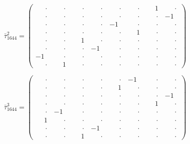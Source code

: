 \documentclass[
  10pt,
]{article}
\begin{document}
\[
\bar\tau_{1644}^{2} = \left(\begin{array}{rrrr|rrrr}
\phantom{-}\cdot & \phantom{-}\cdot & \phantom{-}\cdot & \phantom{-}\cdot & \phantom{-}\cdot & \phantom{-}\cdot & \phantom{-}1 & \phantom{-}\cdot \\[-1.8pt]
\phantom{-}\cdot & \phantom{-}\cdot & \phantom{-}\cdot & \phantom{-}\cdot & \phantom{-}\cdot & \phantom{-}\cdot & \phantom{-}\cdot & -1 \\[-1.8pt]
\phantom{-}\cdot & \phantom{-}\cdot & \phantom{-}\cdot & \phantom{-}\cdot & -1 & \phantom{-}\cdot & \phantom{-}\cdot & \phantom{-}\cdot \\[-1.8pt]
\phantom{-}\cdot & \phantom{-}\cdot & \phantom{-}\cdot & \phantom{-}\cdot & \phantom{-}\cdot & \phantom{-}1 & \phantom{-}\cdot & \phantom{-}\cdot \\[-1.8pt]
\hline
\phantom{-}\cdot & \phantom{-}\cdot & \phantom{-}1 & \phantom{-}\cdot & \phantom{-}\cdot & \phantom{-}\cdot & \phantom{-}\cdot & \phantom{-}\cdot \\[-1.8pt]
\phantom{-}\cdot & \phantom{-}\cdot & \phantom{-}\cdot & -1 & \phantom{-}\cdot & \phantom{-}\cdot & \phantom{-}\cdot & \phantom{-}\cdot \\[-1.8pt]
-1 & \phantom{-}\cdot & \phantom{-}\cdot & \phantom{-}\cdot & \phantom{-}\cdot & \phantom{-}\cdot & \phantom{-}\cdot & \phantom{-}\cdot \\[-1.8pt]
\phantom{-}\cdot & \phantom{-}1 & \phantom{-}\cdot & \phantom{-}\cdot & \phantom{-}\cdot & \phantom{-}\cdot & \phantom{-}\cdot & \phantom{-}\cdot
\end{array}\right)
\]

\[
\bar\tau_{1644}^{3} = \left(\begin{array}{rrrr|rrrr}
\phantom{-}\cdot & \phantom{-}\cdot & \phantom{-}\cdot & \phantom{-}\cdot & \phantom{-}\cdot & -1 & \phantom{-}\cdot & \phantom{-}\cdot \\[-1.8pt]
\phantom{-}\cdot & \phantom{-}\cdot & \phantom{-}\cdot & \phantom{-}\cdot & \phantom{-}1 & \phantom{-}\cdot & \phantom{-}\cdot & \phantom{-}\cdot \\[-1.8pt]
\phantom{-}\cdot & \phantom{-}\cdot & \phantom{-}\cdot & \phantom{-}\cdot & \phantom{-}\cdot & \phantom{-}\cdot & \phantom{-}\cdot & -1 \\[-1.8pt]
\phantom{-}\cdot & \phantom{-}\cdot & \phantom{-}\cdot & \phantom{-}\cdot & \phantom{-}\cdot & \phantom{-}\cdot & \phantom{-}1 & \phantom{-}\cdot \\[-1.8pt]
\hline
\phantom{-}\cdot & -1 & \phantom{-}\cdot & \phantom{-}\cdot & \phantom{-}\cdot & \phantom{-}\cdot & \phantom{-}\cdot & \phantom{-}\cdot \\[-1.8pt]
\phantom{-}1 & \phantom{-}\cdot & \phantom{-}\cdot & \phantom{-}\cdot & \phantom{-}\cdot & \phantom{-}\cdot & \phantom{-}\cdot & \phantom{-}\cdot \\[-1.8pt]
\phantom{-}\cdot & \phantom{-}\cdot & \phantom{-}\cdot & -1 & \phantom{-}\cdot & \phantom{-}\cdot & \phantom{-}\cdot & \phantom{-}\cdot \\[-1.8pt]
\phantom{-}\cdot & \phantom{-}\cdot & \phantom{-}1 & \phantom{-}\cdot & \phantom{-}\cdot & \phantom{-}\cdot & \phantom{-}\cdot & \phantom{-}\cdot
\end{array}\right)
\]
\end{document}
